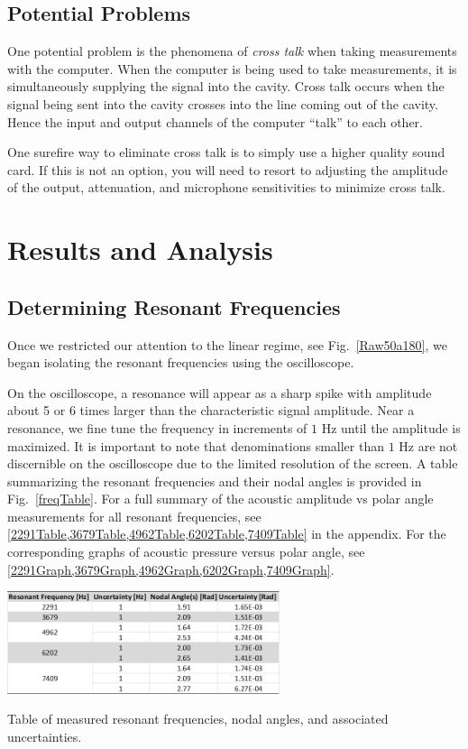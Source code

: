 \documentclass[12pt]{article}
\newcommand{\figref}[1]{Fig.\ \ref{#1}}
\begin{document}
	\subsection{Potential Problems}
	One potential problem is the phenomena of \emph{cross talk} when taking measurements with the computer. When the computer is being used to take measurements, it is simultaneously supplying the signal into the cavity. Cross talk occurs when the signal being sent into the cavity crosses into the line coming out of the cavity. Hence the input and output channels of the computer ``talk'' to each other. 
	
	One surefire way to eliminate cross talk is to simply use a higher quality sound card. If this is not an option, you will need to resort to adjusting the amplitude of the output, attenuation, and microphone sensitivities to minimize cross talk.
	
	
	
	
\section{Results and Analysis}
	
	\subsection{Determining Resonant Frequencies}
	Once we restricted our attention to the linear regime, see \figref{Raw50a180}, we began isolating the resonant frequencies using the oscilloscope.
	
	On the oscilloscope, a resonance will appear as a sharp spike with amplitude about 5 or 6 times larger than the characteristic signal amplitude. Near a resonance, we fine tune the frequency in increments of $1$ Hz until the amplitude is maximized. It is important to note that denominations smaller than $1$ Hz are not discernible on the oscilloscope due to the limited resolution of the screen. A table summarizing the resonant frequencies and their nodal angles is provided in \figref{freqTable}. For a full summary of the acoustic amplitude vs polar angle measurements for all resonant frequencies, see \cref{2291Table,3679Table,4962Table,6202Table,7409Table} in the appendix. For the corresponding graphs of acoustic pressure versus polar angle, see \cref{2291Graph,3679Graph,4962Graph,6202Graph,7409Graph}.
	
	\begin{table}[H]
		\captionsetup{justification = centering}
		\centering
		\includegraphics[width=0.6\textwidth]{Tables/ResTable.png}
		\caption{Table of measured resonant frequencies, nodal angles, and associated uncertainties.}
		\label{freqTable}
	\end{table}
\end{document}
